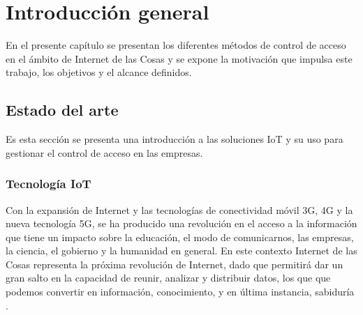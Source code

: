 
\chapter{Introducción general} %

\label{Chapter1} %
\label{IntroGeneral}

En el presente capítulo se presentan los diferentes métodos de control de acceso en el ámbito de Internet de las Cosas y se expone la motivación que impulsa este trabajo, los objetivos y el alcance definidos.


\newcommand{\keyword}[1]{\textbf{#1}}
\newcommand{\tabhead}[1]{\textbf{#1}}
\newcommand{\code}[1]{\texttt{#1}}
\newcommand{\file}[1]{\texttt{\bfseries#1}}
\newcommand{\option}[1]{\texttt{\itshape#1}}
\newcommand{\grados}{$^{\circ}$}



\section{Estado del arte}

Es esta sección se presenta una introducción a las soluciones IoT y su uso para gestionar el control de acceso en las empresas.

\subsection{Tecnología IoT}

Con la expansión de Internet y las tecnologías de conectividad móvil 3G, 4G y la nueva tecnología 5G, se ha producido una revolución en el acceso a la información que tiene un impacto sobre la educación, el modo de comunicarnos, las empresas, la ciencia, el gobierno y la humanidad en general. En este contexto Internet de las Cosas representa la próxima revolución de Internet, dado que permitirá dar un gran salto en la capacidad de reunir, analizar y distribuir datos, los que que podemos convertir en información, conocimiento, y en última instancia, sabiduría \citep{WEBSITE:IOT}.

